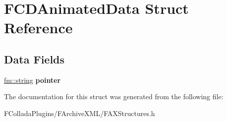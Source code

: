 \hypertarget{structFCDAnimatedData}{
\section{FCDAnimatedData Struct Reference}
\label{structFCDAnimatedData}
}
\subsection*{Data Fields}
\begin{DoxyCompactItemize}
\item 
\hypertarget{structFCDAnimatedData_a91903e493b45979188bbd484bbd8b8fa}{
\hyperlink{classfm_1_1stringT}{fm::string} {\bfseries pointer}}
\label{structFCDAnimatedData_a91903e493b45979188bbd484bbd8b8fa}

\end{DoxyCompactItemize}


The documentation for this struct was generated from the following file:\begin{DoxyCompactItemize}
\item 
FColladaPlugins/FArchiveXML/FAXStructures.h\end{DoxyCompactItemize}
